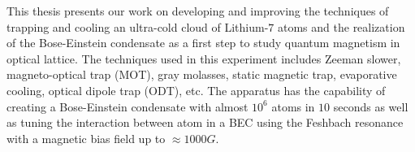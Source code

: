 %
%
%
This thesis presents our work on developing and improving the techniques of trapping and cooling an ultra-cold cloud of Lithium-$7$ atoms and the realization of the Bose-Einstein condensate as a first step to study quantum magnetism in optical lattice. The techniques used in this experiment includes Zeeman slower, magneto-optical trap (MOT), gray molasses, static magnetic trap, evaporative cooling, optical dipole trap (ODT), etc. The apparatus has the capability of creating a Bose-Einstein condensate with almost $10^6$ atoms in $10$ seconds as well as tuning the interaction between atom in a BEC using the Feshbach resonance with a magnetic bias field up to $\approx1000G$.
